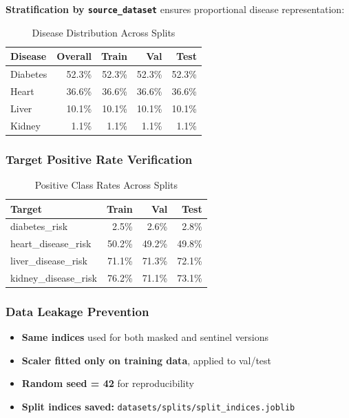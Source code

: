 \documentclass[12pt,a4paper]{article}
\begin{document}
\textbf{Stratification by \texttt{source\_dataset}} ensures proportional disease representation:

\begin{table}[H]
\centering
\caption{Disease Distribution Across Splits}
\begin{tabular}{lrrrr}
\toprule
\textbf{Disease} & \textbf{Overall} & \textbf{Train} & \textbf{Val} & \textbf{Test} \\
\midrule
Diabetes & 52.3\% & 52.3\% & 52.3\% & 52.3\% \\
Heart & 36.6\% & 36.6\% & 36.6\% & 36.6\% \\
Liver & 10.1\% & 10.1\% & 10.1\% & 10.1\% \\
Kidney & 1.1\% & 1.1\% & 1.1\% & 1.1\% \\
\bottomrule
\end{tabular}
\end{table}

\subsubsection{Target Positive Rate Verification}

\begin{table}[H]
\centering
\caption{Positive Class Rates Across Splits}
\begin{tabular}{lrrr}
\toprule
\textbf{Target} & \textbf{Train} & \textbf{Val} & \textbf{Test} \\
\midrule
diabetes\_risk & 2.5\% & 2.6\% & 2.8\% \\
heart\_disease\_risk & 50.2\% & 49.2\% & 49.8\% \\
liver\_disease\_risk & 71.1\% & 71.3\% & 72.1\% \\
kidney\_disease\_risk & 76.2\% & 71.1\% & 73.1\% \\
\bottomrule
\end{tabular}
\end{table}

\subsubsection{Data Leakage Prevention}

\begin{itemize}
    \item \textbf{Same indices} used for both masked and sentinel versions
    \item \textbf{Scaler fitted only on training data}, applied to val/test
    \item \textbf{Random seed = 42} for reproducibility
    \item \textbf{Split indices saved:} \texttt{datasets/splits/split\_indices.joblib}
\end{itemize}
\end{document}
